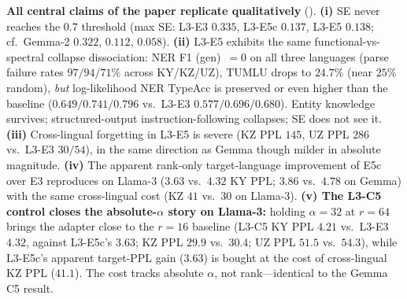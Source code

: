 \documentclass[11pt]{article}
\begin{document}
\textbf{All central claims of the paper replicate qualitatively} (). \textbf{(i)} SE never reaches the $0.7$ threshold (max SE: L3-E3 $0.335$, L3-E5c $0.137$, L3-E5 $0.138$; cf.\ Gemma-2 $0.322$, $0.112$, $0.058$). \textbf{(ii)} L3-E5 exhibits the same functional-vs-spectral collapse dissociation: NER F1 (gen)~$=0$ on all three languages (parse failure rates $97/94/71\%$ across KY/KZ/UZ), TUMLU drops to $24.7\%$ (near $25\%$ random), \emph{but} log-likelihood NER TypeAcc is preserved or even higher than the baseline ($0.649/0.741/0.796$ vs.\ L3-E3 $0.577/0.696/0.680$). Entity knowledge survives; structured-output instruction-following collapses; SE does not see it. \textbf{(iii)} Cross-lingual forgetting in L3-E5 is severe (KZ PPL $145$, UZ PPL $286$ vs.\ L3-E3 $30/54$), in the same direction as Gemma though milder in absolute magnitude. \textbf{(iv)} The apparent rank-only target-language improvement of E5c over E3 reproduces on Llama-3 ($3.63$ vs.\ $4.32$ KY PPL; $3.86$ vs.\ $4.78$ on Gemma) with the same cross-lingual cost (KZ $41$ vs.\ $30$ on Llama-3). \textbf{(v) The L3-C5 control closes the absolute-$\alpha$ story on Llama-3:} holding $\alpha{=}32$ at $r{=}64$ brings the adapter close to the $r{=}16$ baseline (L3-C5 KY PPL $4.21$ vs.\ L3-E3 $4.32$, against L3-E5c's $3.63$; KZ PPL $29.9$ vs.\ $30.4$; UZ PPL $51.5$ vs.\ $54.3$), while L3-E5c's apparent target-PPL gain ($3.63$) is bought at the cost of cross-lingual KZ PPL ($41.1$). The cost tracks absolute $\alpha$, not rank---identical to the Gemma C5 result.
\end{document}
